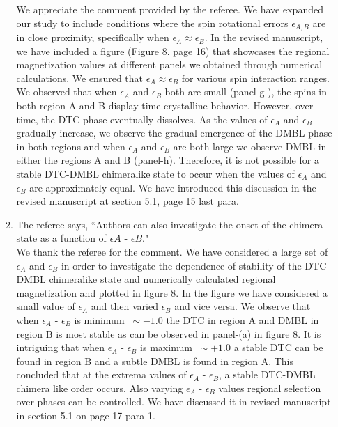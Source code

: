 \documentclass[aps,prb,reprint,showpacs,floatfix,superscriptaddress, onecolumn, nofootinbib, 10pt]{revtex4-2}
\newcommand{\response}[1]{{\color{black}#1}} %
\newcommand{\comment}[1]{{\color{blue}#1}} %
\begin{document}
\begin{enumerate}
\begin{enumerate}
		\response{	
		We appreciate the comment provided by the referee. We have expanded our study to include conditions where the spin rotational errors $\epsilon_{A,B}$ are in close proximity, specifically when $\epsilon_A \approx \epsilon_B$. In the revised manuscript, we have included a figure (Figure 8. page 16) that showcases the regional magnetization values at different panels we obtained through numerical calculations. We ensured that $\epsilon_A \approx \epsilon_B$ for various spin interaction ranges. We observed that when $\epsilon_A$ and $\epsilon_B$ both are small (panel-g ), the spins in both region A and B display time crystalline behavior. However, over time, the DTC phase eventually dissolves. As the values of $\epsilon_A$ and $\epsilon_B$ gradually increase, we observe the gradual emergence of the DMBL phase in both regions and when $\epsilon_A$ and $\epsilon_B$ are both large we observe DMBL in either  the regions A and B (panel-h). Therefore, it is not possible for a stable DTC-DMBL chimeralike state to occur when the values of $\epsilon_A$ and $\epsilon_B$ are approximately equal. We have introduced this discussion in the revised manuscript at section 5.1, page 15 last para.
		}\\
	
		\item The referee says, \comment{``Authors can also investigate the onset of the chimera state as a function of $\epsilon A$ - $\epsilon B$."}\\
		
		\response{We thank the referee for the comment. We have considered a large set of $\epsilon_A$ and $\epsilon_B$ in order to investigate the dependence of stability of the DTC-DMBL chimeralike state and numerically calculated regional magnetization and plotted in figure 8. In the figure we have considered a small value of $\epsilon_A$ and then varied $\epsilon_B$ and vice versa. We observe that when $\epsilon_A$ - $\epsilon_B$ is minimum $~\sim -1.0$ the DTC in region A and DMBL in region B is most stable as can be observed in panel-(a) in figure 8. It is intriguing that when   $\epsilon_A$ - $\epsilon_B$ is maximum $~\sim +1.0$ a stable DTC can be found in region B and a subtle DMBL is found in region A. This concluded that at the extrema values of  $\epsilon_A$ - $\epsilon_B$, a stable DTC-DMBL chimera like order occurs. Also varying $\epsilon_A$ - $\epsilon_B$ values regional selection over phases can be controlled. We have discussed it in revised manuscript in section 5.1 on page 17 para 1. }
		

\end{enumerate}
\end{enumerate}
\end{document}
